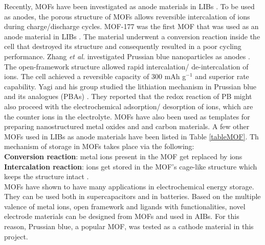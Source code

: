 Recently, MOFs have been investigated as anode materials in LIBs \cite{li_shape-controlled_2006,han_synthesis_2012,zhao_metalorganic_2015}. To be used as anodes, the porous structure of MOFs allows reversible intercalation of  ions during charge/discharge cycles. MOF-177 was the first MOF that was used as an anode material in LIBs \cite{}. The material underwent a conversion reaction inside the cell that destroyed its structure and consequently resulted in a poor cycling performance.  Zhang \textit{et al.} investigated Prussian blue nanoparticles as anodes \cite{nie_prussian_2014}. The open-framework structure allowed rapid intercalation/ de-intercalation of  ions. The cell achieved a reversible capacity of 300 mAh g$^{-1}$ and superior rate capability. Yagi and his group studied the lithiation mechanism in Prussian blue and its analogues (PBAs) \cite{yagi_eqcm_2014}. They reported that the redox reaction of PB might also proceed with the electrochemical adsorption/ desorption of  ions, which are the counter ions in the electrolyte. MOFs have also been used as templates for preparing nanostructured metal oxides and and carbon materials. A few other MOFs used in LIBs as anode materials have been listed in Table \ref{tableMOF}. Th mechanism of  storage in MOFs takes place via the following: \\

\textbf{Conversion reaction}: metal ions present in the MOF get replaced by  ions \\

\textbf{Intercalation reaction}:  ions get stored in the MOF's cage-like structure which keeps the structure intact \cite{wang_metalorganic_2016}. \\

MOFs have shown to have many applications in electrochemical energy storage. They can be used both in supercapacitors and in batteries. Based on the multiple valence of metal ions, open framework and ligands with functionalities, novel electrode materials can be designed from MOFs and used in AIBs. For this reason, Prussian blue, a popular MOF, was tested as a cathode material in this project. 

